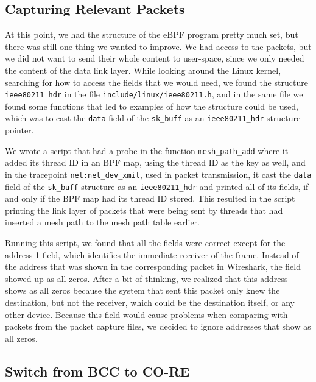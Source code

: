 


\subsection{Capturing Relevant Packets}

At this point, we had the structure of the eBPF program pretty much set, but
there was still one thing we wanted to improve. We had access to the packets,
but we did not want to send their whole content to user-space, since we only
needed the content of the data link layer. While looking around the Linux
kernel, searching for how to access the fields that we would need, we found the
structure \texttt{ieee80211\_hdr} in the file
\texttt{include/linux/ieee80211.h}, and in the same file we found some functions
that led to examples of how the structure could be used, which was to cast the
\texttt{data} field of the \texttt{sk\_buff} as an \texttt{ieee80211\_hdr}
structure pointer.

We wrote a script that had a probe in the function \texttt{mesh\_path\_add}
where it added its thread ID in an BPF map, using the thread ID as the key as
well, and in the tracepoint \texttt{net:net\_dev\_xmit}, used in packet
transmission, it cast the \texttt{data} field of the \texttt{sk\_buff} structure
as an \texttt{ieee80211\_hdr} and printed all of its fields, if and only if the
BPF map had its thread ID stored. This resulted in the script printing the link
layer of packets that were being sent by threads that had inserted a mesh path
to the mesh path table earlier.

Running this script, we found that all the fields were correct except for the
address 1 field, which identifies the immediate receiver of the frame. Instead
of the address that was shown in the corresponding packet in Wireshark, the
field showed up as all zeros. After a bit of thinking, we realized that this
address shows as all zeros because the system that sent this packet only knew
the destination, but not the receiver, which could be the destination itself, or
any other device. Because this field would cause problems when comparing with
packets from the packet capture files, we decided to ignore addresses that show
as all zeros.


\subsection{Switch from BCC to CO-RE}\label{subs:switch}


